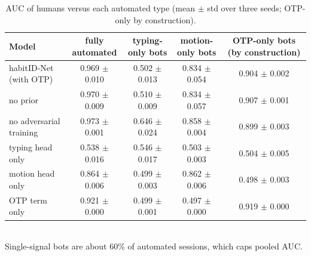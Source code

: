 \begin{table}[t]
\caption{AUC of humans versus each automated type (mean $\pm$ std over three seeds; OTP-only by construction).}
\label{tab:perType}
\centering
\small
\begin{tabular}{lcccc}
\toprule
Model & fully automated & typing-only bots & motion-only bots & OTP-only bots (by construction) \\
\midrule
habitID-Net (with OTP) & 0.969 $\pm$ 0.010 & 0.502 $\pm$ 0.013 & 0.834 $\pm$ 0.054 & 0.904 $\pm$ 0.002 \\
no prior & 0.970 $\pm$ 0.009 & 0.510 $\pm$ 0.009 & 0.834 $\pm$ 0.057 & 0.907 $\pm$ 0.001 \\
no adversarial training & 0.973 $\pm$ 0.001 & 0.646 $\pm$ 0.024 & 0.858 $\pm$ 0.004 & 0.899 $\pm$ 0.003 \\
typing head only & 0.538 $\pm$ 0.016 & 0.546 $\pm$ 0.017 & 0.503 $\pm$ 0.003 & 0.504 $\pm$ 0.005 \\
motion head only & 0.864 $\pm$ 0.006 & 0.499 $\pm$ 0.003 & 0.862 $\pm$ 0.006 & 0.498 $\pm$ 0.003 \\
OTP term only & 0.921 $\pm$ 0.000 & 0.499 $\pm$ 0.001 & 0.497 $\pm$ 0.000 & 0.919 $\pm$ 0.000 \\
\bottomrule
\end{tabular}
\\[2pt]\footnotesize Single-signal bots are about 60\% of automated sessions, which caps pooled AUC.
\end{table}
